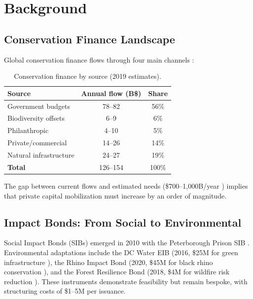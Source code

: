 \documentclass[11pt,a4paper]{article}
\begin{document}
\section{Background}
\label{sec:background}

\subsection{Conservation Finance Landscape}

Global conservation finance flows through four main channels
\citep{deutz2020financing}:

\begin{table}[H]
\centering
\caption{Conservation finance by source (2019 estimates).}
\label{tab:finance}
\begin{tabular}{lcc}
\toprule
\textbf{Source} & \textbf{Annual flow (B\$)} & \textbf{Share} \\
\midrule
Government budgets     & 78--82  & 56\% \\
Biodiversity offsets   & 6--9    & 6\% \\
Philanthropic          & 4--10   & 5\% \\
Private/commercial     & 14--26  & 14\% \\
Natural infrastructure & 24--27  & 19\% \\
\midrule
\textbf{Total}         & 126--154 & 100\% \\
\bottomrule
\end{tabular}
\end{table}

The gap between current flows and estimated needs (\$700--1{,}000B/year
\citep{paulson2020financing}) implies that private capital mobilization
must increase by an order of magnitude.

\subsection{Impact Bonds: From Social to Environmental}

Social Impact Bonds (SIBs) emerged in 2010 with the Peterborough Prison
SIB \citep{liebman2011social}. Environmental adaptations include the DC
Water EIB (2016, \$25M for green infrastructure
\citep{nicola2013quantifying}), the Rhino Impact Bond (2020, \$45M for
black rhino conservation \citep{uct2020rhino}), and the Forest
Resilience Bond (2018, \$4M for wildfire risk reduction
\citep{blue2019forest}). These instruments demonstrate feasibility but
remain bespoke, with structuring costs of \$1--5M per issuance.
\end{document}
